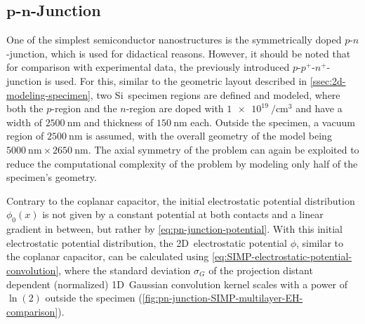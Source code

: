\subsection[\texorpdfstring{$p$-$n$}{\textit{p}-\textit{n}}-Junction]{$\boldsymbol{p}$-$\boldsymbol{n}$-Junction} \label{ssec:SIMP-pn-junction-extension}
One of the simplest semiconductor nanostructures is the symmetrically doped $p$-$n$-junction, which is used for didactical reasons. However, it should be noted that for comparison with experimental data, the previously introduced $p$-$p^+$-$n^+$-junction is used. For this, similar to the geometric layout described in \cref{ssec:2d-modeling-specimen}, two Si~specimen regions are defined and modeled, where both the $p$-region and the $n$-region are doped with $\SI[per-mode=power]{1e19}{\per\cubic\cm}$ and have a width of $\SI{2500}{\nm}$ and thickness of $\SI{150}{\nm}$ each. Outside the specimen, a vacuum region of $\SI{2500}{\nm}$ is assumed, with the overall geometry of the model being $\SI{5000}{\nm} \times \SI{2650}{\nm}$. The axial symmetry of the problem can again be exploited to reduce the computational complexity of the problem by modeling only half of the specimen's geometry.

Contrary to the coplanar capacitor, the initial electrostatic potential distribution $\phi_0\left(x\right)$ is not given by a constant potential at both contacts and a linear gradient in between, but rather by \cref{eq:pn-junction-potential}. With this initial electrostatic potential distribution, the 2D~electrostatic potential $\phi$, similar to the coplanar capacitor, can be calculated using \cref{eq:SIMP-electrostatic-potential-convolution}, where the standard deviation $\sigma_G$ of the projection distant dependent (normalized) 1D~Gaussian convolution kernel scales with a power of $\ln\left(2\right)$ outside the specimen (\cref{fig:pn-junction-SIMP-multilayer-EH-comparison}).


